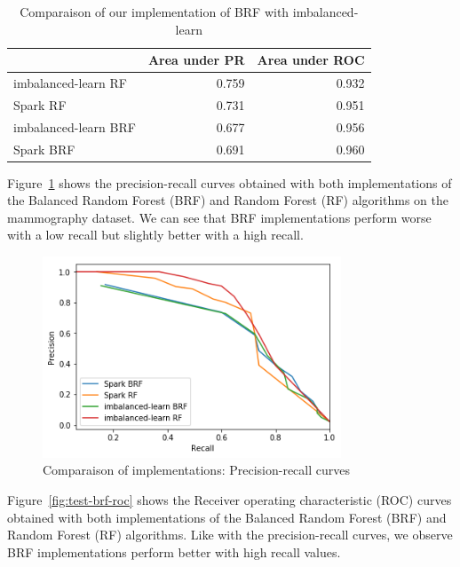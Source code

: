 \documentclass[conference]{IEEEtran}
\begin{document}
\begin{table}[htbp]
\caption{Comparaison of our implementation of BRF with imbalanced-learn}
\begin{center}
\begin{tabular}{|l|r|r|}
\hline
{} &  Area under PR &  Area under ROC \\
\hline
imbalanced-learn RF  &          0.759 &           0.932 \\
Spark RF             &          0.731 &           0.951 \\
imbalanced-learn BRF &          0.677 &           0.956 \\
Spark BRF            &          0.691 &           0.960 \\
\hline
\end{tabular}
\label{table:test_brf_results}
\end{center}
\end{table}

Figure~\ref{fig:test-brf-precision-recall} shows the precision-recall curves obtained with both implementations of the Balanced Random Forest (BRF) and Random Forest (RF) algorithms on the mammography dataset. We can see that BRF implementations perform worse with a low recall but slightly better with a high recall.

\begin{figure}[htbp]
\centerline{\includegraphics[height=6cm, keepaspectratio]{figures/test_brf_pr.png}}
\caption{Comparaison of implementations: Precision-recall curves}
\label{fig:test-brf-precision-recall}
\end{figure}

Figure~\ref{fig:test-brf-roc} shows the Receiver operating characteristic (ROC) curves obtained with both implementations of the Balanced Random Forest (BRF) and Random Forest (RF) algorithms. Like with the precision-recall curves, we observe BRF implementations perform better with high recall values. 
\end{document}
